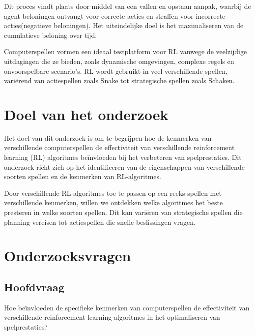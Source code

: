 \documentclass[a4paper,10pt]{report}
\begin{document}
Dit proces vindt plaats door middel van een vallen en opstaan aanpak, waarbij
de agent beloningen ontvangt voor correcte acties en straffen voor incorrecte
acties(negatieve beloningen). Het uiteindelijke doel is het maximaliseren van
de cumulatieve beloning over tijd.

Computerspellen vormen een ideaal testplatform voor RL vanwege de veelzijdige
uitdagingen die ze bieden, zoals dynamische omgevingen, complexe regels en
onvoorspelbare scenario’s. RL wordt gebruikt in veel verschillende spellen,
variërend van actiespellen zoals Snake tot strategische spellen zoals Schaken.

\section{Doel van het onderzoek}
Het doel van dit onderzoek is om te begrijpen hoe de kenmerken van
verschillende computerspellen de effectiviteit van verschillende reinforcement
learning (RL) algoritmes beïnvloeden bij het verbeteren van spelprestaties. Dit
onderzoek richt zich op het identificeren van de eigenschappen van
verschillende soorten spellen en de kenmerken van RL-algoritmes.

Door verschillende RL-algoritmes toe te passen op een reeks spellen met
verschillende kenmerken, willen we ontdekken welke algoritmes het beste
presteren in welke soorten spellen. Dit kan variëren van strategische spellen
die planning vereisen tot actiespellen die snelle beslissingen vragen.
\section{Onderzoeksvragen}
\subsection*{Hoofdvraag}
Hoe beïnvloeden de specifieke kenmerken van computerspellen de effectiviteit
van verschillende reinforcement learning-algoritmes in het optimaliseren van
spelprestaties?
\end{document}
